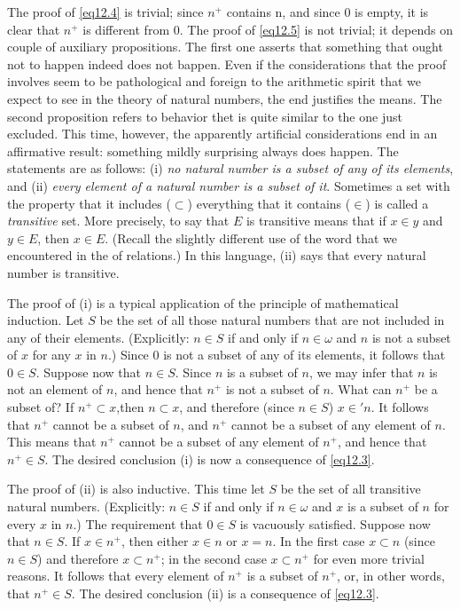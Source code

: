 The proof of \eqref{eq12.4} is trivial; since $n^{+}$ contains n, and since $0$ is empty, it is clear that $n^{+}$ is different from $0$. The proof of \eqref{eq12.5} is not trivial; it depends on couple of auxiliary propositions. The first one asserts that something that ought not to happen indeed does not bappen. Even if the considerations that the proof involves seem to be pathological and foreign to the arithmetic spirit that we expect to see in the theory of natural numbers, the end justifies the means. The second proposition refers to behavior thet is quite similar to the one just excluded. This time, however, the apparently artificial considerations end in an affirmative result: something mildly surprising always does happen. The statements are as follows: (i) \textit{no natural number is a subset of any of its elements}, and  (ii) \textit{every element of a natural number is a subset of it}. Sometimes a set with the property that it includes ($\subset$) everything that it contains ($\in$) is called a \textit{transitive} set. More precisely, to say that $E$ is transitive means that if $x \in y$ and $y \in E$, then $x \in E$. (Recall the slightly different use of the word that we encountered in the of relations.) In this language, (ii) says that every natural number is transitive. 

The proof of (i) is a typical application of the principle of mathematical induction. Let $S$ be the set of all those natural numbers that are not included in any of their elements. (Explicitly: $n \in S$ if and only if $n \in \omega$ and $n$ is not a subset of $x$ for any $x$ in $n$.) Since $0$ is not a subset of any of its elements, it follows that $0 \in S$.  Suppose now that $n \in S$. Since $n$ is a subset of $n$, we may infer that $n$ is not an element of $n$, and hence that $n^{+}$ is not a subset of $n$. What can $n^{+}$ be a subset of? If $n^{+} \subset x$,then $n \subset x$, and therefore (since $n \in S$) $x \in ' n$. It follows that $n^{+}$ cannot be a subset of $n$, and $n^{+}$ cannot be a subset of any element of $n$. This means that $n^{+}$ cannot be a subset of any element of $n^{+}$, and hence that $n^{+} \in S$. The desired conclusion (i) is now a consequence of \eqref{eq12.3}. 

The proof of (ii) is also inductive. This time let $S$ be the set of all transitive natural numbers. (Explicitly: $n \in S$ if and only if $n \in \omega$ and $x$ is a subset of $n$ for every $x$ in $n$.) The requirement that $0 \in S$ is vacuously satisfied.  Suppose now that $n \in S$. If $x \in n^{+}$, then either $x \in n$ or $x = n$. In the first case $x \subset n$ (since $n \in S$) and therefore $x \subset n^{+}$; in the second case $x \subset n^{+}$ for even more trivial reasons. It follows that every element of $n^{+}$ is a subset of $n^{+}$, or, in other words, that $n^{+} \in S$. The desired conclusion (ii) is a consequence of \eqref{eq12.3}. 

